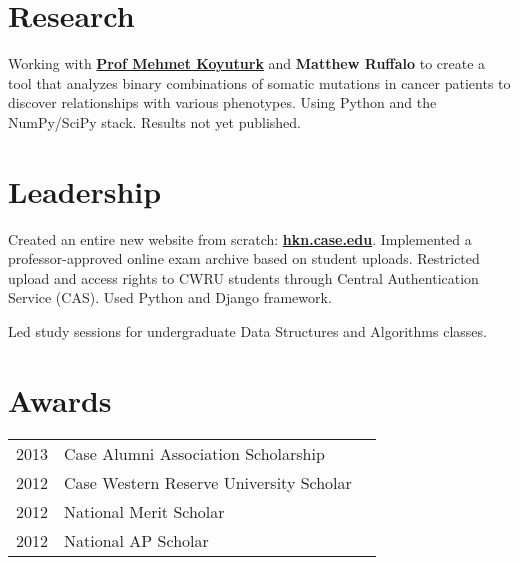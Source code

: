 \documentclass[letterpaper]{deedy-resume} %
\begin{document}
\begin{minipage}[t]{0.66\textwidth}
\section{Research}


 Working with
\textbf{\href{http://engineering.case.edu/profiles/mxk331}{Prof Mehmet
    Koyuturk}} and \textbf{Matthew Ruffalo} to create a tool that analyzes
binary combinations of somatic mutations in cancer patients to discover
relationships with various phenotypes.  Using Python and the NumPy/SciPy stack.
Results not yet published.

\sectionspace %


\section{Leadership}


\begin{tightitemize}
\item Created an entire new website from scratch:
  \textbf{\href{https://hkn.case.edu}{hkn.case.edu}}.  Implemented a
  professor-approved online exam archive based on student uploads.  Restricted
  upload and access rights to CWRU students through Central Authentication
  Service (CAS).  Used Python and Django framework.
\item Led study sessions for undergraduate Data Structures and Algorithms
  classes.
\end{tightitemize}

\sectionspace %


\section{Awards}

\begin{tabular}{rll}
2013 & Case Alumni Association Scholarship \\
2012 & Case Western Reserve University Scholar \\
2012 & National Merit Scholar \\
2012 & National AP Scholar
\end{tabular}


\end{minipage}
\end{document}
